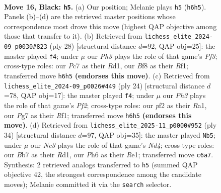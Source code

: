 \documentclass[11pt]{article}
\begin{document}
\clearpage

\begin{figure}[p]\centering
\begin{subfigure}{0.46\textwidth}\centering
\resizebox{\linewidth}{!}{%
\newchessgame
\chessboard[
  setfen={r2q1b2/1bp1rppk/p1np3p/1p1Bp3/4P3/P2P1N1P/1PPBRPP1/RQ4K1 b - - 4 16},
  showmover=false,
  pgfstyle=straightmove, color=movearrow, markmove={h6-h5}
]}
\caption{}
\end{subfigure}\hfill
\begin{subfigure}{0.46\textwidth}\centering
\resizebox{\linewidth}{!}{%
\newchessgame
\chessboard[
  setfen={r2qr1k1/1pp2pbp/p2pb1p1/4n3/2PBP3/1PN2P2/P2QB1PP/3R1RK1 w - - 0 15},
  showmover=false,
  pgfstyle=straightmove, color=movearrow, markmove={f3-f4}
]}
\caption{}
\end{subfigure}
\\[4pt]
\begin{subfigure}{0.46\textwidth}\centering
\resizebox{\linewidth}{!}{%
\newchessgame
\chessboard[
  setfen={rn1qr1k1/pb2pp1p/1p1p2pB/2pPb3/2P1P3/2NB3P/PPQ2PP1/R4RK1 w - - 2 13},
  showmover=false,
  pgfstyle=straightmove, color=movearrow, markmove={f2-f4}
]}
\caption{}
\end{subfigure}\hfill
\begin{subfigure}{0.46\textwidth}\centering
\resizebox{\linewidth}{!}{%
\newchessgame
\chessboard[
  setfen={r2qr1k1/1bp2p1p/1p1p2p1/p1n1b3/2PNP3/1P2BPP1/P1Q3BP/3RR1K1 w - - 1 18},
  showmover=false,
  pgfstyle=straightmove, color=movearrow, markmove={d4-b5}
]}
\caption{}
\end{subfigure}
\caption{\textbf{Move 16, Black: \texttt{h5}.} (a) Our position; Melanie plays \texttt{h5} (\texttt{h6h5}). Panels (b)--(d) are the retrieved master positions whose correspondence most drove this move (highest QAP objective among those that transfer to it). (b) Retrieved from \texttt{lichess\_elite\_2024-09\_p0030\#823} (ply 28) [structural distance $d$=92, QAP obj=25]: the master played \texttt{f4}; under $\mu$ our \emph{Ph3} plays the role of that game's \emph{Pf3}; cross-type roles: our \emph{P}c7 as their \emph{R}d1, our \emph{B}f8 as their \emph{R}f1; transferred move \texttt{h6h5} \textbf{(endorses this move)}. (c) Retrieved from \texttt{lichess\_elite\_2024-09\_p0026\#449} (ply 24) [structural distance $d$=78, QAP obj=17]: the master played \texttt{f4}; under $\mu$ our \emph{Ph3} plays the role of that game's \emph{Pf2}; cross-type roles: our \emph{p}f2 as their \emph{R}a1, our \emph{P}g7 as their \emph{R}f1; transferred move \texttt{h6h5} \textbf{(endorses this move)}. (d) Retrieved from \texttt{lichess\_elite\_2025-11\_p0000\#952} (ply 34) [structural distance $d$=97, QAP obj=35]: the master played \texttt{Nb5}; under $\mu$ our \emph{Nc3} plays the role of that game's \emph{Nd4}; cross-type roles: our \emph{B}b7 as their \emph{R}d1, our \emph{P}h6 as their \emph{R}e1; transferred move \texttt{c6a7}. Synthesis: 2 retrieved analogs transferred to \texttt{h5} (summed QAP objective 42, the strongest correspondence among the candidate moves); Melanie committed it via the \texttt{search} selector.}
\label{fig:thought-m31}
\end{figure}
\end{document}
